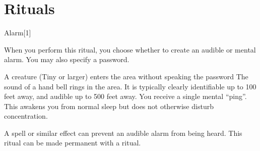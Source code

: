 \section{Rituals}

\small

\begin{spellsection}{Alarm}[1]
    \begin{spellheader}
    \end{spellheader}
    \begin{spellcontent}
        \begin{spelltargetinginfo}
        \end{spelltargetinginfo}
        \begin{spelleffects}
            \spellspecial When you perform this ritual, you choose whether to create an audible or mental alarm. You may also specify a password.
            \spellline
            \begin{spelltrigger}{A creature (Tiny or larger) enters the area without speaking the password}
                 The sound of a hand bell rings in the area. It is typically clearly identifiable up to 100 feet away, and audible up to 500 feet away.
                 You receive a single mental ``ping''. This awakens you from normal sleep but does not otherwise disturb concentration.
            \end{spelltrigger}
            \spelldur \durext \dismissable
        \end{spelleffects}
    \end{spellcontent}
    \begin{spellfooter}
        \spellnotes A  spell or similar effect can prevent an audible alarm from being heard. This ritual can be made permanent with a  ritual.
    \end{spellfooter}
\end{spellsection}


